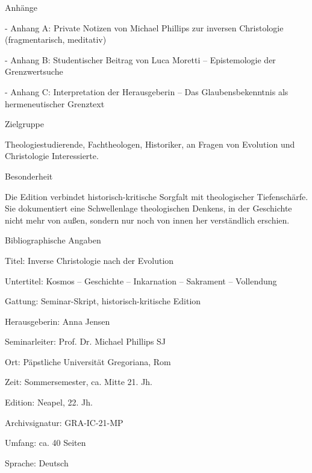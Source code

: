 \documentclass[
  ngerman,
]{article}
\begin{document}
Anhänge

- Anhang A: Private Notizen von Michael Phillips zur inversen
Christologie (fragmentarisch, meditativ)

- Anhang B: Studentischer Beitrag von Luca Moretti -- Epistemologie der
Grenzwertsuche

- Anhang C: Interpretation der Herausgeberin -- Das Glaubensbekenntnis
als hermeneutischer Grenztext

Zielgruppe

Theologiestudierende, Fachtheologen, Historiker, an Fragen von Evolution
und Christologie Interessierte.

Besonderheit

Die Edition verbindet historisch-kritische Sorgfalt mit theologischer
Tiefenschärfe. Sie dokumentiert eine Schwellenlage theologischen
Denkens, in der Geschichte nicht mehr von außen, sondern nur noch von
innen her verständlich erschien.

Bibliographische Angaben

Titel: Inverse Christologie nach der Evolution

Untertitel: Kosmos -- Geschichte -- Inkarnation -- Sakrament --
Vollendung

Gattung: Seminar-Skript, historisch-kritische Edition

Herausgeberin: Anna Jensen

Seminarleiter: Prof. Dr. Michael Phillips SJ

Ort: Päpstliche Universität Gregoriana, Rom

Zeit: Sommersemester, ca. Mitte 21. Jh.

Edition: Neapel, 22. Jh.

Archivsignatur: GRA-IC-21-MP

Umfang: ca. 40 Seiten

Sprache: Deutsch
\end{document}
